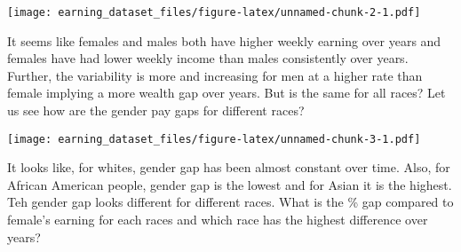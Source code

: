 \documentclass[
]{article}
\newenvironment{Shaded}{\begin{snugshade}}{\end{snugshade}}
\newcommand{\DataTypeTok}[1]{\textcolor[rgb]{0.13,0.29,0.53}{#1}}
\newcommand{\KeywordTok}[1]{\textcolor[rgb]{0.13,0.29,0.53}{\textbf{#1}}}
\newcommand{\NormalTok}[1]{#1}
\newcommand{\OperatorTok}[1]{\textcolor[rgb]{0.81,0.36,0.00}{\textbf{#1}}}
\newcommand{\StringTok}[1]{\textcolor[rgb]{0.31,0.60,0.02}{#1}}
\begin{document}
\texttt{[image: earning\_dataset\_files/figure-latex/unnamed-chunk-2-1.pdf]}

It seems like females and males both have higher weekly earning over
years and females have had lower weekly income than males consistently
over years. Further, the variability is more and increasing for men at a
higher rate than female implying a more wealth gap over years. But is
the same for all races? Let us see how are the gender pay gaps for
different races?

\begin{Shaded}
\end{Shaded}

\texttt{[image: earning\_dataset\_files/figure-latex/unnamed-chunk-3-1.pdf]}

It looks like, for whites, gender gap has been almost constant over
time. Also, for African American people, gender gap is the lowest and
for Asian it is the highest. Teh gender gap looks different for
different races. What is the \% gap compared to female's earning for
each races and which race has the highest difference over years?
\end{document}
